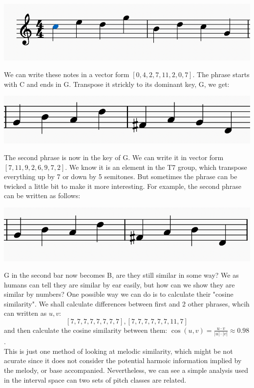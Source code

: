 \documentclass[12pt]{report}
\theoremstyle{definition}
\begin{document}
\begin{center}
    \includegraphics{1}
\end{center}

We can write these notes in a vector form $[0, 4, 2, 7, 11, 2, 0, 7]$. The phrase
starts with C and ends in G. Transpose it strickly to its dominant key, G, we get:
\begin{center}
    \includegraphics{2}
\end{center}
The second phrase is now in the key of G. We can write it in vector 
form $[7, 11, 9, 2, 6, 9, 7, 2]$. We know it is an element in the T7 group,
which transpose everything up by 7 or down by 5 semitones. But sometimes 
the phrase can be twicked a little bit to make it more interesting. For example,
the second phrase can be written as follows:
\begin{center}
    \includegraphics{3}
\end{center}
G in the second bar now becomes B, are they still similar in some way? 
We as humans can tell they are similar by ear easily, but how can we show they are 
similar by numbers? One possible way we can do is to calculate their "cosine similarity". 
We shall calculate differences between first and 2 other phrases, whcih can written as $u, v$:
\[[7,7,7,7,7,7,7,7], [7,7,7,7,7,7,11,7]\] and then calculate the cosine similarity between them:
$\cos(u, v) = \frac{u\cdot v}{|u|\cdot |v|}\approx0.98$.\\
This is just one method of looking at melodic similarity, which might be not acurate since
it does not consider the potential harmoic information implied by the melody, or base 
accompanied. Nevertheless, we can see a simple analysis used in the interval space
can two sets of pitch classes are related.
\end{document}
